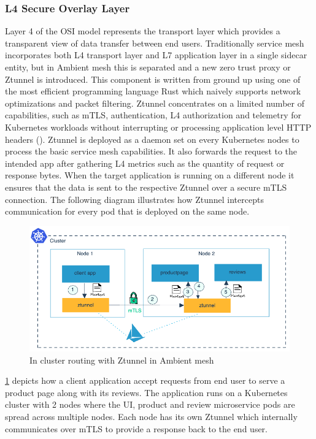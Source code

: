 \subsubsection{L4 Secure Overlay Layer}
Layer 4 of the OSI model represents the transport layer which provides a transparent view of data transfer between end users. Traditionally service mesh incorporates both L4 transport layer and L7 application layer in a single sidecar entity, but in Ambient mesh this is separated and a new zero trust proxy or Ztunnel is introduced. This component is written from ground up using one of the most efficient programming language Rust which naively supports network optimizations and packet filtering. Ztunnel concentrates on a limited number of capabilities, such as mTLS, authentication, L4 authorization and telemetry for Kubernetes workloads without interrupting or processing application level HTTP headers (\cite{istioSun2023}). Ztunnel is deployed as a daemon set on every Kubernetes nodes to process the basic service mesh capabilities. It also forwards the request to the intended app after gathering L4 metrics such as the quantity of request or response bytes. When the target application is running on a different node it ensures that the data is sent to the respective Ztunnel over a secure mTLS connection. The following diagram illustrates how Ztunnel intercepts communication for every pod that is deployed on the same node.

\begin{figure}[ht!]
    \centering
    \includegraphics[width=0.7\linewidth]{resources/ambient-routing-l4.png}
    \caption{In cluster routing with Ztunnel in Ambient mesh}
    \label{lr:ztunnelDesign}
 \end{figure}

 \ref{lr:ztunnelDesign} depicts how a client application accept requests from end user to serve a product page along with its reviews. The application runs on a Kubernetes cluster with 2 nodes where the UI, product and review microservice pods are spread across multiple nodes. Each node has its own Ztunnel which internally communicates over mTLS to provide a response back to the end user.

